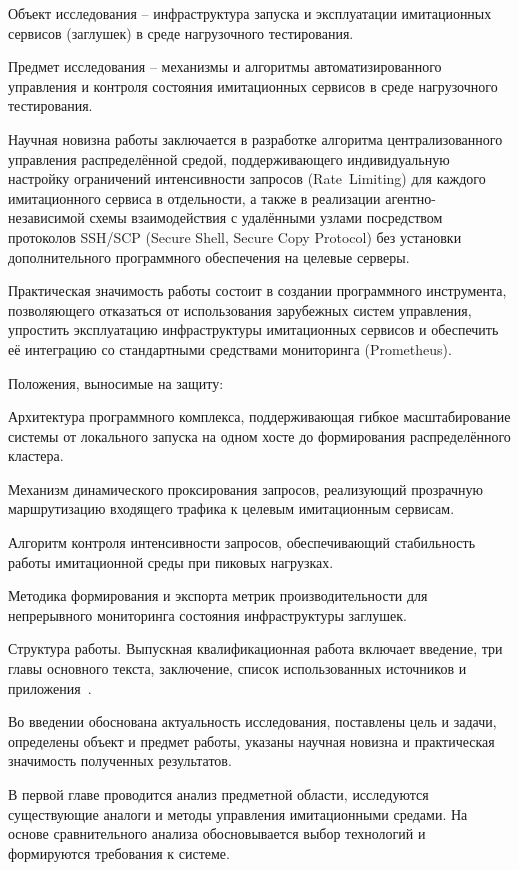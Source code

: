 Объект исследования -- инфраструктура запуска и эксплуатации имитационных сервисов (заглушек) в среде нагрузочного тестирования.

Предмет исследования -- механизмы и алгоритмы автоматизированного управления и контроля состояния имитационных сервисов в среде нагрузочного тестирования.

Научная новизна работы заключается в разработке алгоритма централизованного управления распределённой средой, поддерживающего индивидуальную настройку ограничений интенсивности запросов (Rate~Limiting) для каждого имитационного сервиса в отдельности, а также в реализации агентно-независимой схемы взаимодействия с удалёнными узлами посредством протоколов SSH/SCP (Secure Shell, Secure Copy Protocol) без установки дополнительного программного обеспечения на целевые серверы.

Практическая значимость работы состоит в создании программного инструмента, позволяющего отказаться от использования зарубежных систем управления, упростить эксплуатацию инфраструктуры имитационных сервисов и обеспечить её интеграцию со стандартными средствами мониторинга (Prometheus).

Положения, выносимые на защиту:
\begin{compactlist}
  \item Архитектура программного комплекса, поддерживающая гибкое масштабирование системы от локального запуска на одном хосте до формирования распределённого кластера.
  \item Механизм динамического проксирования запросов, реализующий прозрачную маршрутизацию входящего трафика к целевым имитационным сервисам.
  \item Алгоритм контроля интенсивности запросов, обеспечивающий стабильность работы имитационной среды при пиковых нагрузках.
  \item Методика формирования и экспорта метрик производительности для непрерывного мониторинга состояния инфраструктуры заглушек.
\end{compactlist}

Структура работы. Выпускная квалификационная работа включает введение, три главы основного текста, заключение, список использованных источников и приложения~\cite{gost-7-32-2017}.

Во введении обоснована актуальность исследования, поставлены цель и задачи, определены объект и предмет работы, указаны научная новизна и практическая значимость полученных результатов.

В первой главе проводится анализ предметной области, исследуются существующие аналоги и методы управления имитационными средами. На основе сравнительного анализа обосновывается выбор технологий и формируются требования к системе.

